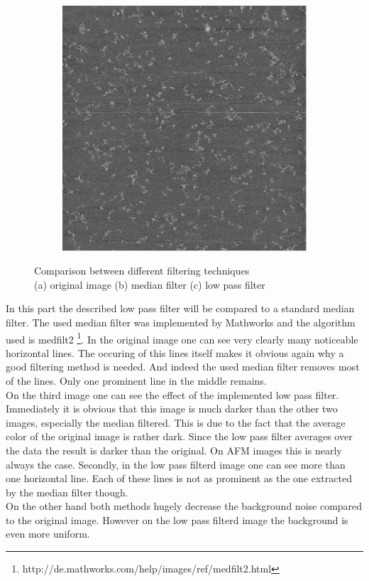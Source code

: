 \documentclass{article}
\begin{document}
\begin{figure}[H]
\begin{subfigure}[b]{0.321\textwidth}
		\caption{}
		\label{fig:onlyMedianFilt}
	\end{subfigure}
	\hspace{\fill}
	\begin{subfigure}[b]{0.321\textwidth}
		\includegraphics[width=\linewidth]{only_low}
		\caption{}
		\label{fig:soLowFilt}
	\end{subfigure}
	\captionsetup{justification=centering}
	\caption{Comparison between different filtering techniques \\
		(a) original image
		(b) median filter
		(c) low pass filter}
	\label{fig:lowpassCompare1}
\end{figure}

In this part the described low pass filter will be compared to a standard median filter. The used median filter was implemented by Mathworks and the algorithm used is medfilt2 \footnote{http://de.mathworks.com/help/images/ref/medfilt2.html}. In the original image one can see very clearly many noticeable horizontal lines. The occuring of this lines itself makes it obvious again why a good filtering method is needed. And indeed the used median filter removes most of the lines. Only one prominent line in the middle remains. \\
On the third image one can see the effect of the implemented low pass filter. Immediately it is obvious that this image is much darker than the other two images, especially the median filtered. This is due to the fact that the average color of the original image is rather dark. Since the low pass filter averages over the data the result is darker than the original. On AFM images this is nearly always the case. Secondly, in the low pass filterd image one can see more than one horizontal line. Each of these lines is not as prominent as the one extracted by the median filter though.  \\
On the other hand both methods hugely decrease the background noise compared to the original image. However on the low pass filterd image the background is even more uniform.
\end{document}
